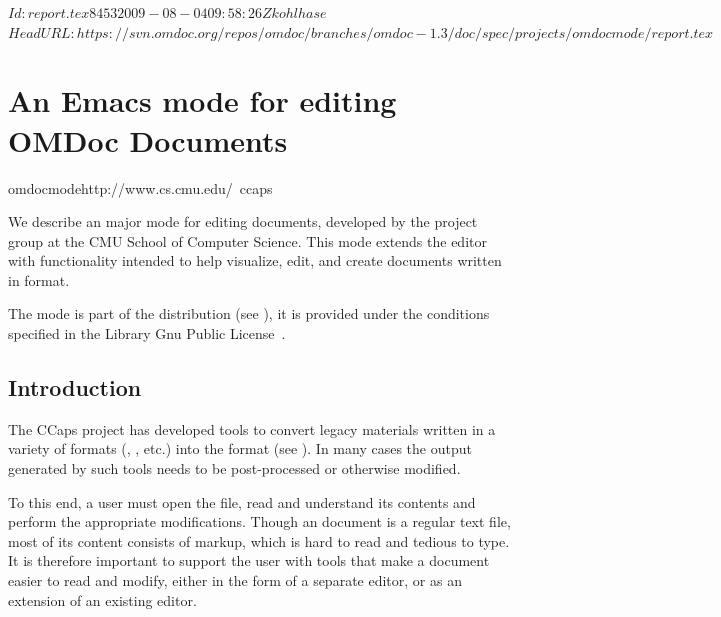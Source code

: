 \svnInfo $Id: report.tex 8453 2009-08-04 09:58:26Z kohlhase $
\svnKeyword $HeadURL: https://svn.omdoc.org/repos/omdoc/branches/omdoc-1.3/doc/spec/projects/omdocmode/report.tex $

\section{An Emacs mode for editing OMDoc Documents}
\begin{project}{omdocmode}{http://www.cs.cmu.edu/~ccaps}
\end{project}

We describe an {\emacs} major mode for editing {\omdoc} documents, developed by the {}
project group at the CMU School of Computer Science.  This mode extends the {\emacs}
editor~\cite{Stallman:em02} with functionality intended to help visualize, edit, and
create documents written in {\omdoc} format.

The mode is part of the {\omdoc} distribution (see {}), it is
provided under the conditions specified in the Library Gnu Public License~\cite{LGPL}.

\subsection{Introduction}

The CCaps project has developed tools to convert legacy materials written in a variety of
formats ({}, {\mathematica}, etc.)  into the {\omdoc} format (see
{}). In many cases the output generated by such tools needs to
be post-processed or otherwise modified.

To this end, a user must open the file, read and understand its contents and perform the
appropriate modifications.  Though an {\omdoc} document is a regular text file, most of
its content consists of markup, which is hard to read and tedious to type.  It is
therefore important to support the user with tools that make a document easier to read and
modify, either in the form of a separate editor, or as an extension of an existing editor.

